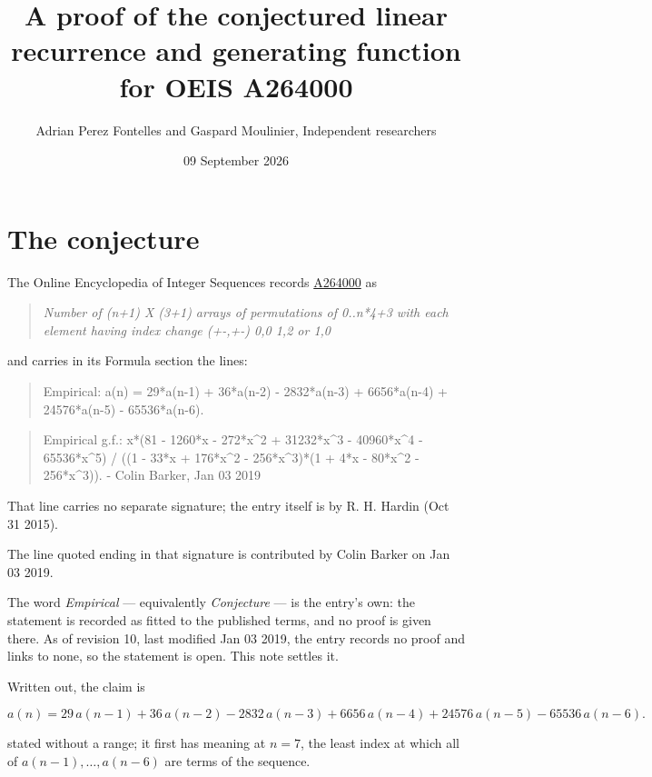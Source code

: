 \documentclass[11pt]{article}
\title{A proof of the conjectured linear recurrence and generating function for OEIS A264000}
\author{Adrian Perez Fontelles and Gaspard Moulinier, Independent researchers}
\date{09 September 2026}
\theoremstyle{definition}
\begin{document}
\maketitle
\section{The conjecture}

The Online Encyclopedia of Integer Sequences records \href{https://oeis.org/A264000}{A264000} as

\begin{quote}\itshape Number of (n+1) X (3+1) arrays of permutations of 0..n*4+3 with each element having index change (+-,+-) 0,0 1,2 or 1,0\end{quote}

and carries in its Formula section the lines:

\begin{quote}\ttfamily Empirical: a(n) = 29*a(n-1) + 36*a(n-2) - 2832*a(n-3) + 6656*a(n-4) + 24576*a(n-5) - 65536*a(n-6).\end{quote}

\begin{quote}\ttfamily Empirical g.f.: x*(81 - 1260*x - 272*x\textasciicircum{}2 + 31232*x\textasciicircum{}3 - 40960*x\textasciicircum{}4 - 65536*x\textasciicircum{}5) / ((1 - 33*x + 176*x\textasciicircum{}2 - 256*x\textasciicircum{}3)*(1 + 4*x - 80*x\textasciicircum{}2 - 256*x\textasciicircum{}3)). - Colin Barker, Jan 03 2019\end{quote}

That line carries no separate signature; the entry itself is by R. H. Hardin (Oct 31 2015).

The line quoted ending in that signature is contributed by Colin Barker on Jan 03 2019.

The word {\itshape Empirical} --- equivalently {\itshape Conjecture} --- is the entry's own: the statement is recorded as fitted to the published terms, and no proof is given there. As of revision 10, last modified Jan 03 2019, the entry records no proof and links to none, so the statement is open. This note settles it.

Written out, the claim is

\[a(n) = 29\,a(n-1) + 36\,a(n-2) - 2832\,a(n-3) + 6656\,a(n-4) + 24576\,a(n-5) - 65536\,a(n-6).\]

stated without a range; it first has meaning at $n = 7$, the least index at which all of $a(n-1),\dots,a(n-6)$ are terms of the sequence.
\end{document}
